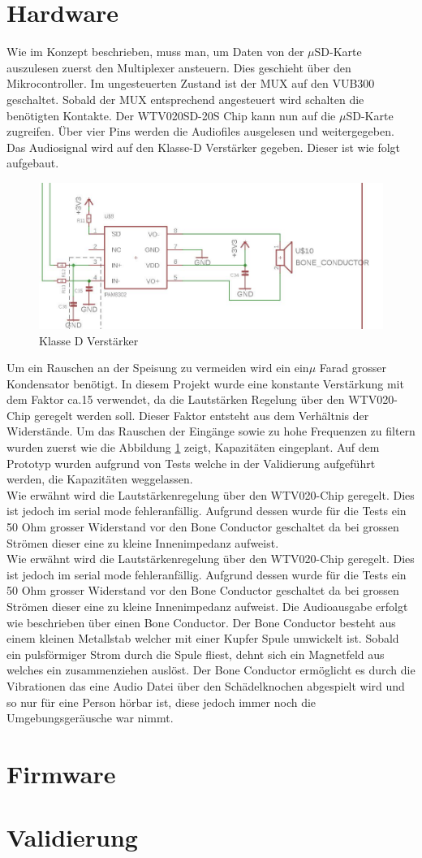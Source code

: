\section{Hardware}
Wie im Konzept beschrieben, muss man, um Daten von der $\mu$SD-Karte auszulesen zuerst den Multiplexer ansteuern. Dies geschieht über den Mikrocontroller. Im ungesteuerten Zustand ist der MUX auf den VUB300 geschaltet. Sobald der MUX entsprechend angesteuert wird schalten die benötigten Kontakte. Der WTV020SD-20S Chip kann nun auf die $\mu$SD-Karte zugreifen. Über vier Pins werden die Audiofiles ausgelesen und weitergegeben. Das Audiosignal wird auf den Klasse-D Verstärker gegeben. Dieser ist wie folgt aufgebaut.
\begin{figure}[h]
	\centering
	\includegraphics[width=15cm]{Bilder/Klasse-D.jpg}
	\caption{Klasse D Verstärker}
	\label{Klasse-D}
\end{figure}
Um ein Rauschen an der Speisung zu vermeiden wird ein ein$\mu$ Farad grosser Kondensator benötigt. In diesem Projekt wurde eine konstante Verstärkung mit dem Faktor ca.15 verwendet, da die Lautstärken Regelung über den WTV020-Chip geregelt werden soll. Dieser Faktor entsteht aus dem Verhältnis der Widerstände. Um das Rauschen der Eingänge sowie zu hohe Frequenzen zu filtern wurden zuerst wie die Abbildung \ref{Klasse-D} zeigt, Kapazitäten eingeplant. Auf dem Prototyp wurden aufgrund von Tests welche in der Validierung aufgeführt werden, die Kapazitäten weggelassen.\\ Wie erwähnt wird die Lautstärkenregelung über den WTV020-Chip geregelt. Dies ist jedoch im serial mode fehleranfällig. Aufgrund dessen wurde für die Tests ein 50 Ohm grosser Widerstand vor den Bone Conductor geschaltet da bei grossen Strömen dieser eine zu kleine Innenimpedanz aufweist.\\ Wie erwähnt wird die Lautstärkenregelung über den WTV020-Chip geregelt. Dies ist jedoch im serial mode fehleranfällig. Aufgrund dessen wurde für die Tests ein 50 Ohm grosser Widerstand vor den Bone Conductor geschaltet da bei grossen Strömen dieser eine zu kleine Innenimpedanz aufweist. Die Audioausgabe erfolgt wie beschrieben über einen Bone Conductor. Der Bone Conductor besteht aus einem kleinen Metallstab welcher mit einer Kupfer Spule umwickelt ist. Sobald ein pulsförmiger Strom durch die Spule fliest, dehnt sich ein Magnetfeld aus welches ein zusammenziehen auslöst. Der Bone Conductor ermöglicht es durch die Vibrationen das eine Audio Datei über den Schädelknochen abgespielt wird und so nur für eine Person hörbar ist, diese jedoch immer noch die Umgebungsgeräusche war nimmt.

\section{Firmware}

\section{Validierung}